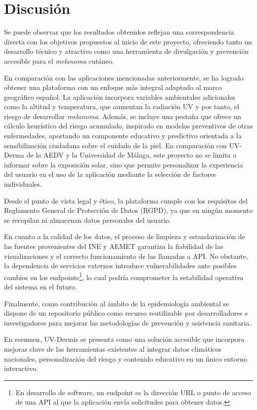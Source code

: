 \clearpage
\section{Discusión}

Se puede observar que los resultados obtenidos reflejan una correspondencia directa con los objetivos propuestos al inicio de este proyecto, ofreciendo tanto un desarrollo técnico y atractivo  como una herramienta de divulgación y prevención accesible para el \textit{melanoma} cutáneo.

En comparación con las aplicaciones mencionadas anteriormente, se ha logrado obtener una plataforma con un enfoque más integral adaptado al marco geográfico español.
La aplicación  incorpora variables ambientales adicionales como la altitud y temperatura, que aumentan la radiación UV y por tanto, el riesgo de desarrollar \textit{melanoma}. Además, se incluye una pestaña que ofrece un cálculo heurístico del riesgo acumulado, inspirado en modelos preventivos de otras enfermedades, aportando un componente educativo y predictivo orientada a la sensibilización ciudadana sobre el cuidado de la piel.
En comparación con UV-Derma de la AEDV y la Universidad de Málaga, este proyecto no se limita a informar sobre la exposición solar, sino que permite personalizar la experiencia del usuario en el uso de la aplicación mediante la selección de factores individuales.

Desde el punto de vista legal y ético, la plataforma cumple con los requisitos del Reglamento General de Protección de Datos (RGPD), ya que en ningún momento se recopilan ni almacenan datos personales del usuario.

En cuanto a la calidad de los datos, el proceso de limpieza y estandarización de las fuentes provenientes del INE y AEMET garantiza la fiabilidad de las visualizaciones y el correcto funcionamiento de las llamadas a API. No obstante, la dependencia de servicios externos introduce vulnerabilidades ante posibles cambios en los endpoints\footnote{En desarrollo de software, un endpoint es la dirección URL o punto de acceso de una API al que la aplicación envía solicitudes para obtener datos.}, lo cual podría comprometer la estabilidad operativa del sistema en el futuro.

Finalmente, como contribución al ámbito de la epidemiología ambiental se dispone de un repositorio público como recurso reutilizable por desarrolladores e investigadores para mejorar las metodologías de prevención y asistencia sanitaria.

En resumen, UV-Dermis se presenta como una solución accesible que incorpora mejoras clave de las herramientas existentes al integrar datos climáticos nacionales, personalización del riesgo y contenido educativo en un único entorno interactivo.


